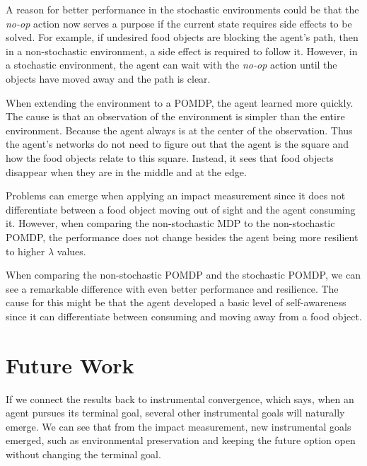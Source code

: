 \documentclass[12pt,A4]{report}
\theoremstyle{definition}
\begin{document}
A reason for better performance in the stochastic environments could be that the \textit{no-op} action now serves a purpose if the current state requires side effects to be solved. For example, if undesired food objects are blocking the agent's path, then in a non-stochastic environment, a side effect is required to follow it. However, in a stochastic environment, the agent can wait with the \textit{no-op} action until the objects have moved away and the path is clear.

When extending the environment to a POMDP, the agent learned more quickly. The cause is that an observation of the environment is simpler than the entire environment. Because the agent always is at the center of the observation. Thus the agent's networks do not need to figure out that the agent is the square and how the food objects relate to this square. Instead, it sees that food objects disappear when they are in the middle and at the edge.

Problems can emerge when applying an impact measurement since it does not differentiate between a food object moving out of sight and the agent consuming it. However, when comparing the non-stochastic MDP to the non-stochastic POMDP, the performance does not change besides the agent being more resilient to higher $\lambda$ values. 

When comparing the non-stochastic POMDP and the stochastic POMDP,  we can see a remarkable difference with even better performance and resilience. The cause for this might be that the agent developed a basic level of self-awareness since it can differentiate between consuming and moving away from a food object. 


\section{Future Work}
If we connect the results back to instrumental convergence, which says, when an agent pursues its terminal goal, several other instrumental goals will naturally emerge. We can see that from the impact measurement, new instrumental goals emerged, such as environmental preservation and keeping the future option open without changing the terminal goal. 
\end{document}
